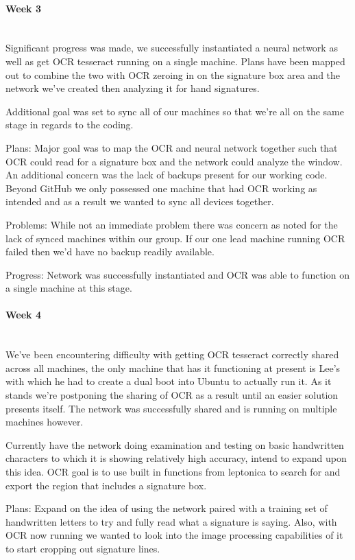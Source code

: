 \documentclass[article, onecolumn, draftclsnofoot,10pt, compsoc]{IEEEtran}
\begin{document}
\paragraph{Week 3}
\mbox{}\\
Significant progress was made, we successfully instantiated a neural network as well as get OCR tesseract running on a single machine. Plans have been mapped out to combine the two with OCR zeroing in on the signature box area and the network we've created then analyzing it for hand signatures.
 
Additional goal was set to sync all of our machines so that we're all on the same stage in regards to the coding.
 
Plans:
Major goal was to map the OCR and neural network together such that OCR could read for a signature box and the network could analyze the window. An additional concern was the lack of backups present for our working code. Beyond GitHub we only possessed one machine that had OCR working as intended and as a result we wanted to sync all devices together.
 
Problems:
While not an immediate problem there was concern as noted for the lack of synced machines within our group. If our one lead machine running OCR failed then we'd have no backup readily available.
 
Progress:
Network was successfully instantiated and OCR was able to function on a single machine at this stage.

\paragraph{Week 4}
\mbox{}\\
We've been encountering difficulty with getting OCR tesseract correctly shared across all machines, the only machine that has it functioning at present is Lee's with which he had to create a dual boot into Ubuntu to actually run it. As it stands we're postponing the sharing of OCR as a result until an easier solution presents itself. The network was successfully shared and is running on multiple machines however. 
 
Currently have the network doing examination and testing on basic handwritten characters to which it is showing relatively high accuracy, intend to expand upon this idea. OCR goal is to use built in functions from leptonica to search for and export the region that includes a signature box.
 
Plans:
Expand on the idea of using the network paired with a training set of handwritten letters to try and fully read what a signature is saying. Also, with OCR now running we wanted to look into the image processing capabilities of it to start cropping out signature lines.
 
\end{document}
